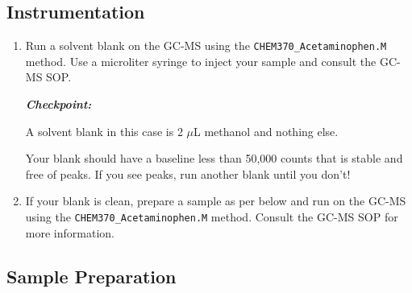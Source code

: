 \documentclass[]{tufte-book}
\providecommand{\tightlist}{%
  \setlength{\itemsep}{0pt}\setlength{\parskip}{0pt}}
\begin{document}
\hypertarget{instrumentation-1}{%
\subsection{Instrumentation}\label{instrumentation-1}}

\begin{enumerate}
\def\labelenumi{\arabic{enumi}.}
\tightlist
\item
  Run a solvent blank on the GC-MS using the \texttt{CHEM370\_Acetaminophen.M} method. Use a microliter syringe to inject your sample and consult the GC-MS SOP.

  \begin{marginfigure}
   \textbf{\emph{Checkpoint:}}

   A solvent blank in this case is 2 \(\mu\)L methanol and nothing else.

   Your blank should have a baseline less than 50,000 counts that is stable
   and free of peaks. If you see peaks, run another blank until you don't!
   \end{marginfigure}
\item
  If your blank is clean, prepare a sample as per below and run on the GC-MS using the \texttt{CHEM370\_Acetaminophen.M} method. Consult the GC-MS SOP for more information.
\end{enumerate}

\hypertarget{sample-preparation-2}{%
\subsection{Sample Preparation}\label{sample-preparation-2}}
\end{document}
